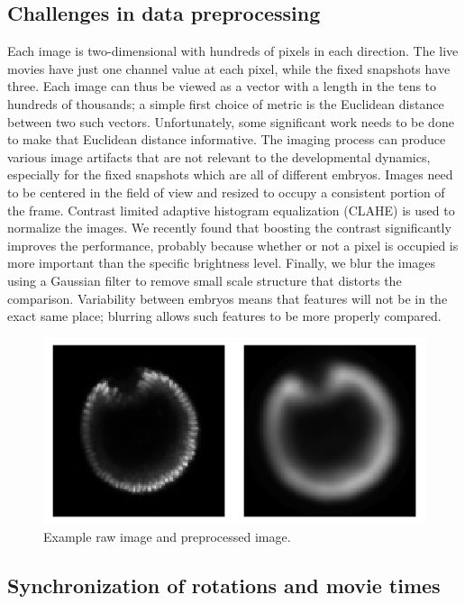 \documentclass[12pt]{article}
\begin{document}
\subsection{Challenges in data preprocessing}

Each image is two-dimensional with hundreds of pixels in each direction. The live movies have just one channel value at each pixel, while the fixed snapshots have three. Each image can thus be viewed as a vector with a length in the tens to hundreds of thousands; a simple first choice of metric is the Euclidean distance between two such vectors. Unfortunately, some significant work needs to be done to make that Euclidean distance informative. The imaging process can produce various image artifacts that are not relevant to the developmental dynamics, especially for the fixed snapshots which are all of different embryos. Images need to be centered in the field of view and resized to occupy a consistent portion of the frame. Contrast limited adaptive histogram equalization (CLAHE) is used to normalize the images. We recently found that boosting the contrast significantly improves the performance, probably because whether or not a pixel is occupied is more important than the specific brightness level. Finally, we blur the images using a Gaussian filter to remove small scale structure that distorts the comparison. Variability between embryos means that features will not be in the exact same place; blurring allows such features to be more properly compared.

\begin{figure}[h]
\centering
\includegraphics[height=\liveheight]{figures/preprocess} \par
\caption{Example raw image and preprocessed image.}
\label{fig:pp}
\end{figure}

\subsection{Synchronization of rotations and movie times}
\end{document}
